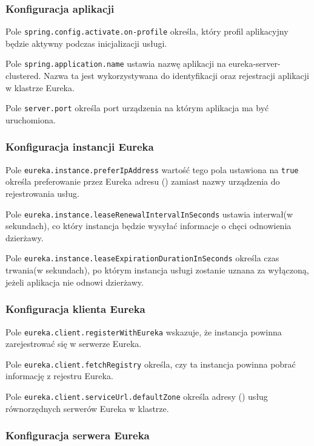 \subsubsection{Konfiguracja aplikacji}

Pole \verb|spring.config.activate.on-profile| określa, który profil aplikacyjny będzie aktywny podczas inicjalizacji usługi.

Pole \verb|spring.application.name| ustawia nazwę aplikacji na eureka-server-clustered. Nazwa ta jest wykorzystywana do identyfikacji oraz rejestracji aplikacji w klastrze Eureka.

Pole \verb|server.port| określa port urządzenia na którym aplikacja ma być uruchomiona.

\subsubsection{Konfiguracja instancji Eureka}

Pole \verb|eureka.instance.preferIpAddress| wartość tego pola ustawiona na \verb|true| określa preferowanie przez Eureka adresu  () zamiast nazwy urządzenia do rejestrowania usług.

Pole \verb|eureka.instance.leaseRenewalIntervalInSeconds| ustawia interwał(w sekundach), co który instancja będzie wysyłać informacje o chęci odnowienia dzierżawy.

Pole \verb|eureka.instance.leaseExpirationDurationInSeconds| określa czas trwania(w sekundach), po którym instancja usługi zostanie uznana za wyłączoną, jeżeli aplikacja nie odnowi dzierżawy.

\subsubsection{Konfiguracja klienta Eureka}

Pole \verb|eureka.client.registerWithEureka| wskazuje, że instancja powinna zarejestrować się w serwerze Eureka.

Pole \verb|eureka.client.fetchRegistry| określa, czy ta instancja powinna pobrać informację z rejestru Eureka.

Pole \verb|eureka.client.serviceUrl.defaultZone| określa adresy  () usług równorzędnych serwerów Eureka w klastrze.

\subsubsection{Konfiguracja serwera Eureka}

